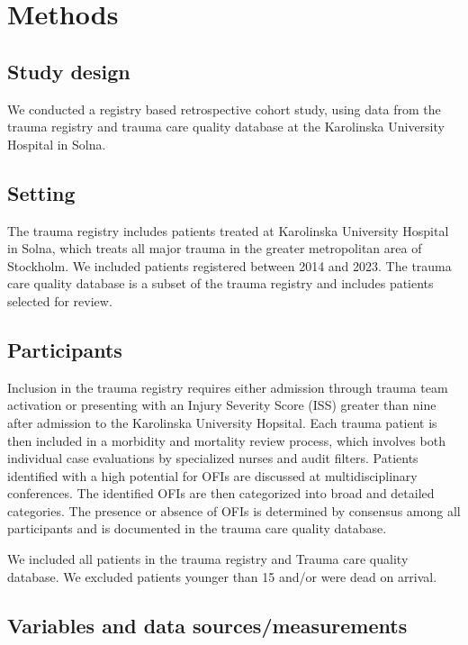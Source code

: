 \documentclass[
]{article}
\begin{document}
\hypertarget{methods-1}{%
\section{Methods}\label{methods-1}}

\hypertarget{study-design}{%
\subsection{Study design}\label{study-design}}

We conducted a registry based retrospective cohort study, using data
from the trauma registry and trauma care quality database at the
Karolinska University Hospital in Solna.

\hypertarget{setting}{%
\subsection{Setting}\label{setting}}

The trauma registry includes patients treated at Karolinska University
Hospital in Solna, which treats all major trauma in the greater
metropolitan area of Stockholm. We included patients registered between
2014 and 2023. The trauma care quality database is a subset of the
trauma registry and includes patients selected for review.

\hypertarget{participants}{%
\subsection{Participants}\label{participants}}

Inclusion in the trauma registry requires either admission through
trauma team activation or presenting with an Injury Severity Score (ISS)
greater than nine after admission to the Karolinska University Hopsital.
Each trauma patient is then included in a morbidity and mortality review
process, which involves both individual case evaluations by specialized
nurses and audit filters. Patients identified with a high potential for
OFIs are discussed at multidisciplinary conferences. The identified OFIs
are then categorized into broad and detailed categories. The presence or
absence of OFIs is determined by consensus among all participants and is
documented in the trauma care quality database.

We included all patients in the trauma registry and Trauma care quality
database. We excluded patients younger than 15 and/or were dead on
arrival.

\hypertarget{variables-and-data-sourcesmeasurements}{%
\subsection{Variables and data
sources/measurements}\label{variables-and-data-sourcesmeasurements}}
\end{document}
